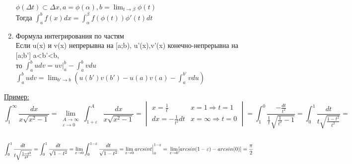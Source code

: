 \documentclass[12pt]{article}
\begin{document}
\begin{enumerate}
        $\phi(\Delta t) \subset \Delta x,a=\phi(\alpha),b=\lim_{t \to \beta}\phi(t)$\\
        Тогда $\int_{a}^{b}f(x)dx=\int_{\alpha}^{\beta} f(\phi(t))\phi'(t)dt$
        \item Формула интегрирования по частям\\
        Если u(x) и v(x) непрерывна на [a;b), u'(x),v'(x) конечно-непрерывна на [a;b'] a<b'<b, \\ то $\int_{a}^{b}udv=uv\Big|^b_a - \int_{a}^{b}vdu$\\
        $\int_{a}^{b}udv=\lim_{b' \to b} (u(b')v(b')-u(a)v(a)-\int_{a}^{b'}vdu)$
    \end{enumerate}
    \underline{Пример:}\\

    \[\int_{1}^{\infty}\frac{dx}{x\sqrt{x^2-1}}=\lim_{\substack{A \to \infty \\ \varepsilon \to 0}} \int_{1+\varepsilon}^{A} \frac{dx}{x\sqrt{x^2-1}} =
    \begin{vmatrix}
        x=\frac{1}{t} & x=1 \Rightarrow t=1\\
        dx=-\frac{1}{t^2}dt & x=\infty \Rightarrow t=0
    \end{vmatrix} = \int_{1}^{0} \frac{-\frac{dt}{t^2}}{\frac{1}{t}\sqrt{\frac{1}{t^2}-1}}=\int_{0}^{1}\frac{dt}{t\sqrt{\frac{1-t^2}{t^2}}}=\] \\
    \[\int_{0}^{1} \frac{dt}{t\sqrt{\frac{1-t^2}{t^2}}}=
    \int_{0}^{1}\frac{dt}{\sqrt{1-t^2}}=\lim_{\varepsilon \to 0} \int_{0}^{1-\varepsilon}\frac{dt}{\sqrt{1-t^2}}=\lim_{\varepsilon \to 0} arcsin t\Big|^{1-\varepsilon}_0=\\
    \lim_{\varepsilon \to 0}[arcsin(1-\varepsilon)-arcsin(0)]=\frac{\pi}{2} \] \\
\end{document}
